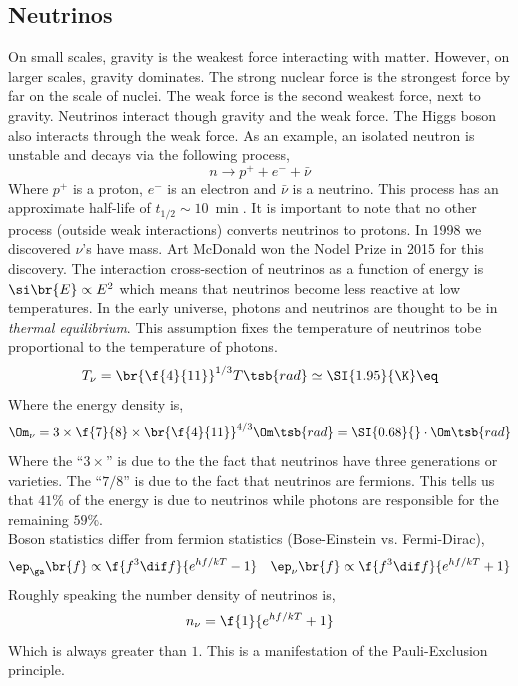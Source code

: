 \documentclass{article}
\begin{document}
\subsection{Neutrinos}

On small scales, gravity is the weakest force interacting with matter. However, on larger scales, gravity dominates. The strong nuclear force is the strongest force by far on the scale of nuclei. The weak force is the second weakest force, next to gravity. Neutrinos interact though gravity and the weak force. The Higgs boson also interacts through the weak force. As an example, an isolated neutron is unstable and decays via the following process,
\[ n \to p^+ + e^- + \bar \nu \]
Where $p^+$ is a proton, $e^-$ is an electron and $\bar \nu$ is a neutrino. This process has an approximate half-life of $t_{1/2} \sim \SI{10}{\min}$. It is important to note that no other process (outside weak interactions) converts neutrinos to protons. In 1998 we discovered $\nu$'s have mass. Art McDonald won the Nodel Prize in 2015 for this discovery. The interaction cross-section of neutrinos as a function of energy is $\si\br{E} \propto E^2$ which means that neutrinos become less reactive at low temperatures. In the early universe, photons and neutrinos are thought to be in \textit{thermal equilibrium}. This assumption fixes the temperature of neutrinos tobe proportional to the temperature of photons.
\[ T_{\nu} = \br{\f{4}{11}}^{1/3} T\tsb{rad} \simeq \SI{1.95}{\K} \eq \label{eq:thermal_equilibrium_neutrinos_photons}\]
Where the energy density is,
\[ \Om_{\nu} = 3 \times \f{7}{8} \times \br{\f{4}{11}}^{4/3} \Om\tsb{rad} = \SI{0.68}{}\cdot\Om\tsb{rad} \]
Where the ``$3\times$'' is due to the the fact that neutrinos have three generations or varieties. The ``$7/8$'' is due to the fact that neutrinos are fermions. This tells us that $41\%$ of the energy is due to neutrinos while photons are responsible for the remaining $59\%$.\\

Boson statistics differ from fermion statistics (Bose-Einstein vs. Fermi-Dirac),
\[ \ep_\ga\br{f} \propto \f{f^3 \dif f}{e^{hf/kT} - 1} \quad \ep_\nu\br{f} \propto \f{f^3 \dif f}{e^{hf/kT} + 1} \]
Roughly speaking the number density of neutrinos is,
\[ n_\nu = \f{1}{e^{h f/kT} + 1} \]
Which is always greater than $1$. This is a manifestation of the Pauli-Exclusion principle. \\
\end{document}
